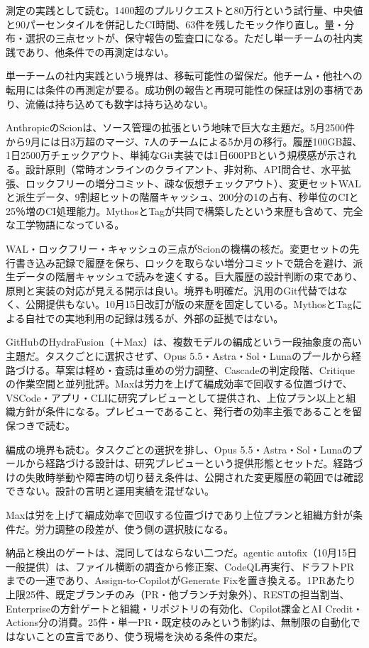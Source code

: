 \documentclass[lualatex,a4paper,10pt]{jlreq}
\begin{document}
測定の実践として読む。1400超のプルリクエストと80万行という試行量、中央値と90パーセンタイルを併記したCI時間、63件を残したモック作り直し。量・分布・選択の三点セットが、保守報告の監査口になる。ただし単一チームの社内実践であり、他条件での再測定はない。
\cite{B31}


単一チームの社内実践という境界は、移転可能性の留保だ。他チーム・他社への転用には条件の再測定が要る。成功例の報告と再現可能性の保証は別の事柄であり、流儀は持ち込めても数字は持ち込めない。
\cite{B31}


AnthropicのScionは、ソース管理の拡張という地味で巨大な主題だ。5月2500件から9月には日3万超のマージ、7人のチームによる5か月の移行。履歴100GB超、1日2500万チェックアウト、単純なGit実装では1日600PBという規模感が示される。設計原則（常時オンラインのクライアント、非対称、API問合せ、水平拡張、ロックフリーの増分コミット、疎な仮想チェックアウト）、変更セットWALと派生データ、9割超ヒットの階層キャッシュ、200分の1の占有、秒単位のCIと25％増のCI処理能力。MythosとTagが共同で構築したという来歴も含めて、完全な工学物語になっている。
\cite{B32,B75}


WAL・ロックフリー・キャッシュの三点がScionの機構の核だ。変更セットの先行書き込み記録で履歴を保ち、ロックを取らない増分コミットで競合を避け、派生データの階層キャッシュで読みを速くする。巨大履歴の設計判断の束であり、原則と実装の対応が見える開示は良い。境界も明確だ。汎用のGit代替ではなく、公開提供もない。10月15日改訂が版の来歴を固定している。MythosとTagによる自社での実地利用の記録は残るが、外部の証拠ではない。
\cite{B32,B75}


GitHubのHydraFusion（＋Max）は、複数モデルの編成という一段抽象度の高い主題だ。タスクごとに選択させず、Opus 5.5・Astra・Sol・Lunaのプールから経路づける。草案は軽め・査読は重めの労力調整、Cascadeの判定段階、Critiqueの作業空間と並列批評。Maxは労力を上げて編成効率で回収する位置づけで、VSCode・アプリ・CLIに研究プレビューとして提供され、上位プラン以上と組織方針が条件になる。プレビューであること、発行者の効率主張であることを留保つきで読む。
\cite{B33,B76}


編成の境界も読む。タスクごとの選択を排し、Opus 5.5・Astra・Sol・Lunaのプールから経路づける設計は、研究プレビューという提供形態とセットだ。経路づけの失敗時挙動や障害時の切り替え条件は、公開された変更履歴の範囲では確認できない。設計の言明と運用実績を混ぜない。
\cite{B33,B76}


Maxは労を上げて編成効率で回収する位置づけであり上位プランと組織方針が条件だ。労力調整の段差が、使う側の選択肢になる。
\cite{B33,B76}


納品と検出のゲートは、混同してはならない二つだ。agentic autofix（10月15日一般提供）は、ファイル横断の調査から修正案、CodeQL再実行、ドラフトPRまでの一連であり、Assign-to-CopilotがGenerate Fixを置き換える。1PRあたり上限25件、既定ブランチのみ（PR・他ブランチ対象外）、RESTの担当割当、Enterpriseの方針ゲートと組織・リポジトリの有効化、Copilot課金とAI Credit・Actions分の消費。25件・単一PR・既定枝のみという制約は、無制限の自動化ではないことの宣言であり、使う現場を決める条件の束だ。
\cite{B34,B77}
\end{document}
